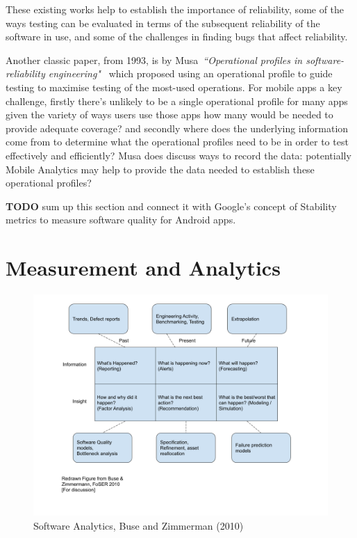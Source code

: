 These existing works help to establish the importance of reliability, some of the ways testing can be evaluated in terms of the subsequent reliability of the software in use, and some of the challenges in finding bugs that affect reliability. 

Another classic paper, from 1993, is by Musa~\emph{``Operational profiles in software-reliability engineering"}~\cite{musa1993_operational_profiles} which proposed using an operational profile to guide testing to maximise testing of the most-used operations. For mobile apps a key challenge, firstly there's unlikely to be a single operational profile for many apps given the variety of ways users use those apps how many would be needed to provide adequate coverage? and secondly where does the underlying information come from to determine what the operational profiles need to be in order to test effectively and efficiently? Musa does discuss ways to record the data: potentially Mobile Analytics may help to provide the data needed to establish these operational profiles? 

\textbf{TODO} sum up this section and connect it with Google's concept of Stability metrics to measure software quality for Android apps.

\section{Measurement and Analytics}

\begin{figure}
    \centering
    \includegraphics[width=14cm]{images/Buse_and_Zimmermann_2010_figure.png}
    \caption{Software Analytics, Buse and Zimmerman (2010)}
    \label{fig:software_analytics_buse_and_zimmerman_2010}
\end{figure}


